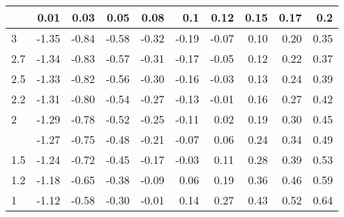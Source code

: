 
\begin{tabular}{lrrrrrrrrr}
\toprule
  & 0.01 & 0.03 & 0.05 & 0.08 & 0.1 & 0.12 & 0.15 & 0.17 & 0.2\\
\midrule
3 & -1.35 & -0.84 & -0.58 & -0.32 & -0.19 & -0.07 & 0.10 & 0.20 & 0.35\\
2.7 & -1.34 & -0.83 & -0.57 & -0.31 & -0.17 & -0.05 & 0.12 & 0.22 & 0.37\\
2.5 & -1.33 & -0.82 & -0.56 & -0.30 & -0.16 & -0.03 & 0.13 & 0.24 & 0.39\\
2.2 & -1.31 & -0.80 & -0.54 & -0.27 & -0.13 & -0.01 & 0.16 & 0.27 & 0.42\\
2 & -1.29 & -0.78 & -0.52 & -0.25 & -0.11 & 0.02 & 0.19 & 0.30 & 0.45\\
\addlinespace
1.7 & -1.27 & -0.75 & -0.48 & -0.21 & -0.07 & 0.06 & 0.24 & 0.34 & 0.49\\
1.5 & -1.24 & -0.72 & -0.45 & -0.17 & -0.03 & 0.11 & 0.28 & 0.39 & 0.53\\
1.2 & -1.18 & -0.65 & -0.38 & -0.09 & 0.06 & 0.19 & 0.36 & 0.46 & 0.59\\
1 & -1.12 & -0.58 & -0.30 & -0.01 & 0.14 & 0.27 & 0.43 & 0.52 & 0.64\\
\bottomrule
\end{tabular}
